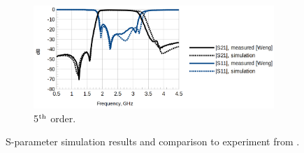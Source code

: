 \documentclass[titlepage]{article}
\renewcommand\_{\textunderscore\linebreak[1]}
\begin{document}
\begin{figure}[p]
\begin{subfigure}{0.72\textwidth}
     \includegraphics[width=\linewidth]{../regression/OpenParEM3D/microstrip/filter_study/screenshots/microstrip_filter_5th_order.png}
     \caption{5$^{\textnormal{th}}$ order.}
  \end{subfigure}
  \caption{S-parameter simulation results and comparison to experiment from \cite{Weng}.}
  \label{fig:filter_results}
\end{figure}
\end{document}
